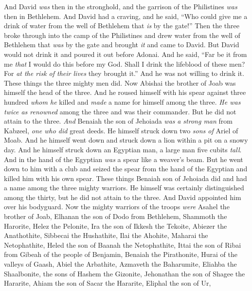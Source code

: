 \begin{biblechapter}
\verse And David \textit{was} then in the stronghold, and the garrison of the Philistines \textit{was} then in Bethlehem.
\verse And David had a craving, and he said, “Who could give me a drink of water from the well of Bethlehem that \textit{is} by the gate!”
\verse Then the three broke through into the camp of the Philistines and drew water from the well of Bethlehem that \textit{was} by the gate and brought \textit{it} and came to David. But David would not drink it and poured it out before Adonai.
\verse And he said, “Far be it from me \textit{that} I would do this before my God. Shall I drink the lifeblood of these men? For \textit{at the risk of their lives} they brought it.” And he was not willing to drink it. These things the three mighty men did.
\verse Now Abishai the brother of Joab was himself the head of the three. And he roused himself with his spear against three hundred \textit{whom he} killed and \textit{made} a name for himself among the three.
\verse \textit{He was twice as renowned} among the three and was their commander. But he did not attain to the three.
\verse \textit{And} Benaiah the son of Jehoiada \textit{was} \textit{a strong man} from Kabzeel, \textit{one who did} great deeds. He himself struck down two \textit{sons of} Ariel of Moab. And he himself went down and struck down a lion within a pit on a snowy day.
\verse And he himself struck down an Egyptian man, a large man five cubits \textit{tall}. And in the hand of the Egyptian \textit{was} a spear like a weaver’s beam. But he went down to him with a club and seized the spear from the hand of the Egyptian and killed him with his own spear.
\verse These things Benaiah son of Jehoiada did and had a name among the three mighty warriors.
\verse He himself was certainly distinguished among the thirty, but he did not attain to the three. And David appointed him over his bodyguard.
\verse Now the mighty warriors of the troops \textit{were} Asahel the brother of Joab, Elhanan the son of Dodo from Bethlehem,
\verse Shammoth the Harorite, Helez the Pelonite,
\verse Ira the son of Ikkesh the Tekoite, Abiezer the Anathothite,
\verse Sibbecai the Hushathite, Ilai the Ahohite,
\verse Maharai the Netophathite, Heled the son of Baanah the Netophathite,
\verse Ittai the son of Ribai from Gibeah of the people of Benjamin, Benaiah the Pirathonite,
\verse Hurai of the valleys of Gaash, Abiel the Arbathite,
\verse Azmaveth the Baharumite, Eliahba the Shaalbonite,
\verse the sons of Hashem the Gizonite, Jehonathan the son of Shagee the Hararite,
\verse Ahiam the son of Sacar the Hararite, Eliphal the son of Ur,

\end{biblechapter}
